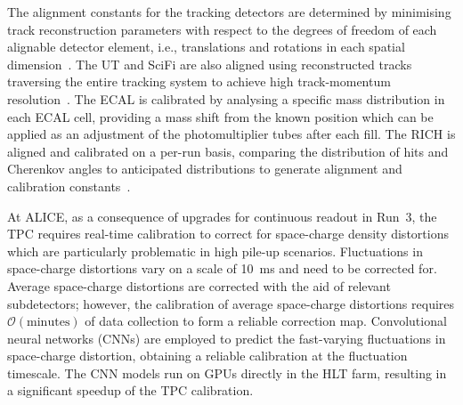 The alignment constants for the tracking detectors are determined by minimising track reconstruction parameters with respect to the degrees of freedom of each alignable detector element, i.e., translations and rotations in each spatial dimension~\cite{LHCb:wouter-kf}. The UT and SciFi are also aligned using reconstructed tracks traversing the entire tracking system to achieve high track-momentum resolution~\cite{Reiss:2846414}. The ECAL is calibrated by analysing a specific mass distribution in each ECAL cell, providing a mass shift from the known position which can be applied as an adjustment of the photomultiplier tubes after each fill. The RICH is aligned and calibrated on a per-run basis, comparing the distribution of hits and Cherenkov angles to anticipated distributions to generate alignment and calibration constants~\cite{LHCb:RICH_AlignCalib}.

At ALICE, as a consequence of upgrades for continuous readout in Run~3, the TPC requires real-time calibration to correct for space-charge density distortions which are particularly problematic in high pile-up scenarios. Fluctuations in space-charge distortions vary on a scale of \SI{10}{\milli\second} and need to be corrected for. Average space-charge distortions are corrected with the aid of relevant subdetectors; however, the calibration of average space-charge distortions requires $\mathcal{O}\left(\mathrm{minutes}\right)$ of data collection to form a reliable correction map. Convolutional neural networks (CNNs) are employed to predict the fast-varying fluctuations in space-charge distortion, obtaining a reliable calibration at the fluctuation timescale. The CNN models run on GPUs directly in the HLT farm, resulting in a significant speedup of the TPC calibration.
